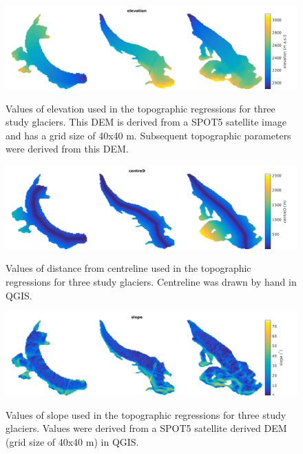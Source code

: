 \documentclass[12pt]{article}
\begin{document}
\begin{landscape}

\begin{figure}
	\centering
	\includegraphics[height = 0.4\textwidth]{Map_elevation.png}\\
	\caption{Values of elevation used in the topographic regressions for three study glaciers. This DEM is derived from a SPOT5 satellite image and has a grid size of 40x40 m. Subsequent topographic parameters were derived from this DEM.}
	\label{map:elev}
\end{figure}

\begin{figure}
	\centering
	\includegraphics[height = 0.4\textwidth]{Map_centreD.png}\\
	\caption{Values of distance from centreline used in the topographic regressions for three study glaciers. Centreline was drawn by hand in QGIS.}
	\label{map:centreD}
\end{figure}

\begin{figure}
	\centering
	\includegraphics[height = 0.4\textwidth]{Map_slope.png}\\
	\caption{Values of slope used in the topographic regressions for three study glaciers. Values were derived from a SPOT5 satellite derived DEM (grid size of 40x40 m) in QGIS.}
	\label{map:slope}
\end{figure}


\end{landscape}
\end{document}

